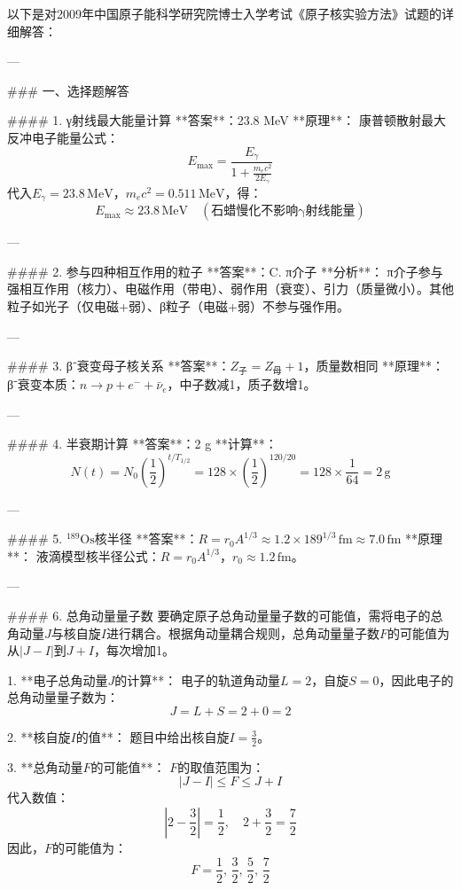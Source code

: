 \documentclass{article}
\begin{document}
  以下是对2009年中国原子能科学研究院博士入学考试《原子核实验方法》试题的详细解答：

---

### 一、选择题解答

#### 1. γ射线最大能量计算  
**答案**：23.8 MeV  
**原理**：  
康普顿散射最大反冲电子能量公式：  
\[
E_{\text{max}} = \frac{E_\gamma}{1 + \frac{m_e c^2}{2E_\gamma}}  
\]  
代入\( E_\gamma = 23.8 \, \text{MeV} \)，\( m_e c^2 = 0.511 \, \text{MeV} \)，得：  
\[
E_{\text{max}} \approx 23.8 \, \text{MeV} \quad (\text{石蜡慢化不影响γ射线能量})  
\]

---

#### 2. 参与四种相互作用的粒子  
**答案**：C. π介子  
**分析**：  
π介子参与强相互作用（核力）、电磁作用（带电）、弱作用（衰变）、引力（质量微小）。其他粒子如光子（仅电磁+弱）、β粒子（电磁+弱）不参与强作用。

---

#### 3. β⁻衰变母子核关系  
**答案**：\( Z_{\text{子}} = Z_{\text{母}} + 1 \)，质量数相同  
**原理**：  
β⁻衰变本质：\( n \to p + e^- + \bar{\nu}_e \)，中子数减1，质子数增1。

---

#### 4. 半衰期计算  
**答案**：2 g  
**计算**：  
\[
N(t) = N_0 \left(\frac{1}{2}\right)^{t/T_{1/2}} = 128 \times \left(\frac{1}{2}\right)^{120/20} = 128 \times \frac{1}{64} = 2 \, \text{g}
\]

---

#### 5. \(^{189}\text{Os}\)核半径  
**答案**：\( R = r_0 A^{1/3} \approx 1.2 \times 189^{1/3} \, \text{fm} \approx 7.0 \, \text{fm} \)  
**原理**：  
液滴模型核半径公式：\( R = r_0 A^{1/3} \)，\( r_0 \approx 1.2 \, \text{fm} \)。

---

#### 6. 总角动量量子数  
要确定原子总角动量量子数的可能值，需将电子的总角动量\( J \)与核自旋\( I \)进行耦合。根据角动量耦合规则，总角动量量子数\( F \)的可能值为从\( |J - I| \)到\( J + I \)，每次增加1。

1. **电子总角动量\( J \)的计算**：  
   电子的轨道角动量\( L = 2 \)，自旋\( S = 0 \)，因此电子的总角动量量子数为：
   \[
   J = L + S = 2 + 0 = 2
   \]

2. **核自旋\( I \)的值**：  
   题目中给出核自旋\( I = \frac{3}{2} \)。

3. **总角动量\( F \)的可能值**：  
   \( F \)的取值范围为：
   \[
   |J - I| \leq F \leq J + I
   \]
   代入数值：
   \[
   |2 - \frac{3}{2}| = \frac{1}{2}, \quad 2 + \frac{3}{2} = \frac{7}{2}
   \]
   因此，\( F \)的可能值为：
   \[
   F = \frac{1}{2}, \, \frac{3}{2}, \, \frac{5}{2}, \, \frac{7}{2}
   \]
\end{document}
